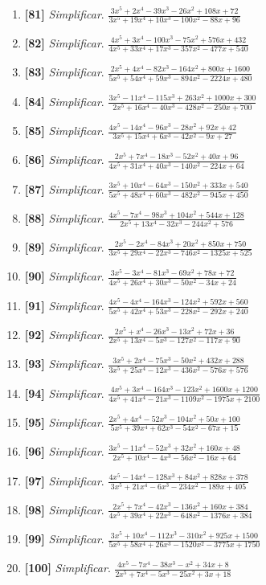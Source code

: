 \documentclass[11pt,a4paper]{article}
\newcommand{\ejercicio}[3]{\item \textbf{[#1]} \textit{#2}. $ #3 $}
\begin{document}
\begin{enumerate}
\ejercicio{81}{Simplificar}{\frac{3 x^{5} + 2 x^{4} - 39 x^{3} - 26 x^{2} + 108 x + 72}{3 x^{5} + 19 x^{4} + 10 x^{3} - 100 x^{2} - 88 x + 96}}
\ejercicio{82}{Simplificar}{\frac{4 x^{5} + 3 x^{4} - 100 x^{3} - 75 x^{2} + 576 x + 432}{4 x^{5} + 33 x^{4} + 17 x^{3} - 357 x^{2} - 477 x + 540}}
\ejercicio{83}{Simplificar}{\frac{2 x^{5} + 4 x^{4} - 82 x^{3} - 164 x^{2} + 800 x + 1600}{5 x^{5} + 54 x^{4} + 59 x^{3} - 894 x^{2} - 2224 x + 480}}
\ejercicio{84}{Simplificar}{\frac{3 x^{5} - 11 x^{4} - 115 x^{3} + 263 x^{2} + 1000 x + 300}{2 x^{5} + 16 x^{4} - 40 x^{3} - 428 x^{2} - 250 x + 700}}
\ejercicio{85}{Simplificar}{\frac{4 x^{5} - 14 x^{4} - 96 x^{3} - 28 x^{2} + 92 x + 42}{3 x^{5} + 15 x^{4} + 6 x^{3} - 42 x^{2} - 9 x + 27}}
\ejercicio{86}{Simplificar}{\frac{2 x^{5} + 7 x^{4} - 18 x^{3} - 52 x^{2} + 40 x + 96}{4 x^{5} + 31 x^{4} + 40 x^{3} - 140 x^{2} - 224 x + 64}}
\ejercicio{87}{Simplificar}{\frac{3 x^{5} + 10 x^{4} - 64 x^{3} - 150 x^{2} + 333 x + 540}{5 x^{5} + 48 x^{4} + 60 x^{3} - 482 x^{2} - 945 x + 450}}
\ejercicio{88}{Simplificar}{\frac{4 x^{5} - 7 x^{4} - 98 x^{3} + 104 x^{2} + 544 x + 128}{2 x^{5} + 13 x^{4} - 32 x^{3} - 244 x^{2} + 576}}
\ejercicio{89}{Simplificar}{\frac{2 x^{5} - 2 x^{4} - 84 x^{3} + 20 x^{2} + 850 x + 750}{3 x^{5} + 29 x^{4} - 22 x^{3} - 746 x^{2} - 1325 x + 525}}
\ejercicio{90}{Simplificar}{\frac{3 x^{5} - 3 x^{4} - 81 x^{3} - 69 x^{2} + 78 x + 72}{4 x^{5} + 26 x^{4} + 30 x^{3} - 50 x^{2} - 34 x + 24}}
\ejercicio{91}{Simplificar}{\frac{4 x^{5} - 4 x^{4} - 164 x^{3} - 124 x^{2} + 592 x + 560}{5 x^{5} + 42 x^{4} + 53 x^{3} - 228 x^{2} - 292 x + 240}}
\ejercicio{92}{Simplificar}{\frac{2 x^{5} + x^{4} - 26 x^{3} - 13 x^{2} + 72 x + 36}{2 x^{5} + 13 x^{4} - 5 x^{3} - 127 x^{2} - 117 x + 90}}
\ejercicio{93}{Simplificar}{\frac{3 x^{5} + 2 x^{4} - 75 x^{3} - 50 x^{2} + 432 x + 288}{3 x^{5} + 25 x^{4} - 12 x^{3} - 436 x^{2} - 576 x + 576}}
\ejercicio{94}{Simplificar}{\frac{4 x^{5} + 3 x^{4} - 164 x^{3} - 123 x^{2} + 1600 x + 1200}{4 x^{5} + 41 x^{4} - 21 x^{3} - 1109 x^{2} - 1975 x + 2100}}
\ejercicio{95}{Simplificar}{\frac{2 x^{5} + 4 x^{4} - 52 x^{3} - 104 x^{2} + 50 x + 100}{5 x^{5} + 39 x^{4} + 62 x^{3} - 54 x^{2} - 67 x + 15}}
\ejercicio{96}{Simplificar}{\frac{3 x^{5} - 11 x^{4} - 52 x^{3} + 32 x^{2} + 160 x + 48}{2 x^{5} + 10 x^{4} - 4 x^{3} - 56 x^{2} - 16 x + 64}}
\ejercicio{97}{Simplificar}{\frac{4 x^{5} - 14 x^{4} - 128 x^{3} + 84 x^{2} + 828 x + 378}{3 x^{5} + 21 x^{4} - 6 x^{3} - 234 x^{2} - 189 x + 405}}
\ejercicio{98}{Simplificar}{\frac{2 x^{5} + 7 x^{4} - 42 x^{3} - 136 x^{2} + 160 x + 384}{4 x^{5} + 39 x^{4} + 22 x^{3} - 648 x^{2} - 1376 x + 384}}
\ejercicio{99}{Simplificar}{\frac{3 x^{5} + 10 x^{4} - 112 x^{3} - 310 x^{2} + 925 x + 1500}{5 x^{5} + 58 x^{4} + 26 x^{3} - 1520 x^{2} - 3775 x + 1750}}
\ejercicio{100}{Simplificar}{\frac{4 x^{5} - 7 x^{4} - 38 x^{3} - x^{2} + 34 x + 8}{2 x^{5} + 7 x^{4} - 5 x^{3} - 25 x^{2} + 3 x + 18}}
\end{enumerate}
\end{document}
